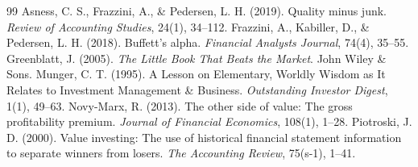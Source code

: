 \documentclass[10pt,twocolumn]{article}
\begin{document}
\begin{thebibliography}{99}
 Asness, C. S., Frazzini, A., \& Pedersen, L. H. (2019). Quality minus junk. \textit{Review of Accounting Studies}, 24(1), 34--112.
 Frazzini, A., Kabiller, D., \& Pedersen, L. H. (2018). Buffett's alpha. \textit{Financial Analysts Journal}, 74(4), 35--55.
 Greenblatt, J. (2005). \textit{The Little Book That Beats the Market}. John Wiley \& Sons.
 Munger, C. T. (1995). A Lesson on Elementary, Worldly Wisdom as It Relates to Investment Management \& Business. \textit{Outstanding Investor Digest}, 1(1), 49--63.
 Novy-Marx, R. (2013). The other side of value: The gross profitability premium. \textit{Journal of Financial Economics}, 108(1), 1--28.
 Piotroski, J. D. (2000). Value investing: The use of historical financial statement information to separate winners from losers. \textit{The Accounting Review}, 75(s-1), 1--41.
\end{thebibliography}
\end{document}
